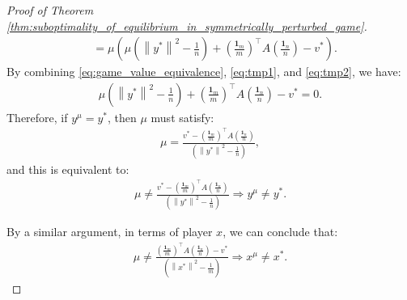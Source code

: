 \documentclass[10pt,a4paper]{amsart}
\newcommand{\bone}{\mathbf{1}}
\begin{document}
\begin{proof}[Proof of Theorem \ref{thm:suboptimality_of_equilibrium_in_symmetrically_perturbed_game}]
\begin{align}
        & = \mu \left(\mu \left(\left\|y^{\ast}\right\|^2 - \frac{1}{n}\right) + \left(\frac{\bone_m}{m}\right)^{\top}A\left(\frac{\bone_n}{n}\right) - v^{\ast}\right).
        \label{eq:tmp2}
    \end{align}
    By combining \eqref{eq:game_value_equivalence}, \eqref{eq:tmp1}, and \eqref{eq:tmp2}, we have:
    \begin{align*}
        \mu \left(\left\|y^{\ast}\right\|^2 - \frac{1}{n}\right) + \left(\frac{\bone_m}{m}\right)^{\top}A\left(\frac{\bone_n}{n}\right) - v^{\ast} = 0.
    \end{align*}
    Therefore, if $y^{\mu} = y^{\ast}$, then $\mu$ must satisfy:
    \begin{align*}
        \mu = \frac{v^{\ast} - \left(\frac{\bone_m}{m}\right)^{\top}A\left(\frac{\bone_n}{n}\right)}{\left(\left\|y^{\ast}\right\|^2 - \frac{1}{n}\right)},
    \end{align*}
    and this is equivalent to:
    \begin{align*}
        \mu \neq \frac{v^{\ast} - \left(\frac{\bone_m}{m}\right)^{\top}A\left(\frac{\bone_n}{n}\right)}{\left(\left\|y^{\ast}\right\|^2 - \frac{1}{n}\right)} \Rightarrow y^{\mu} \neq y^{\ast}.
    \end{align*}

    By a similar argument, in terms of player $x$, we can conclude that:
    \begin{align*}
        \mu \neq \frac{\left(\frac{\bone_m}{m}\right)^{\top}A\left(\frac{\bone_n}{n}\right) - v^{\ast}}{\left(\left\|x^{\ast}\right\|^2 - \frac{1}{m}\right)} \Rightarrow x^{\mu} \neq x^{\ast}.
    \end{align*}
\end{proof}
\end{document}
